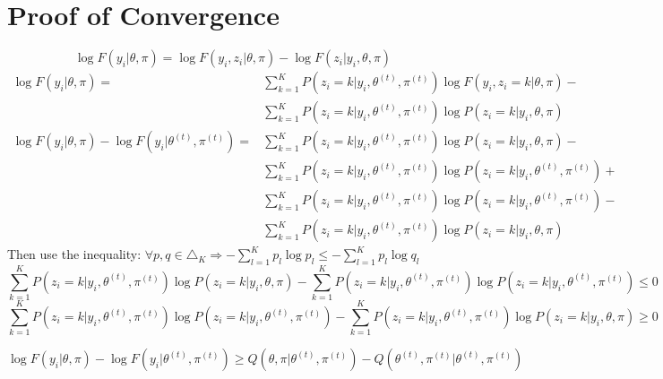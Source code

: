 \documentclass[11pt]{article}
\begin{document}
\section{Proof of Convergence}
$$\log F(y_i|\theta,\pi)=\log F(y_i,z_i|\theta,\pi)-\log F(z_i|y_i,\theta,\pi)$$
\begin{align*}
	\log F(y_i|\theta,\pi)=&\sum_{k=1}^KP(z_i=k|y_i,\theta^{(t)},\pi^{(t)})
	\log F(y_i,z_i=k|\theta,\pi)-\\
	&\sum_{k=1}^KP(z_i=k|y_i,\theta^{(t)},\pi^{(t)})
	\log P(z_i=k|y_i,\theta,\pi)\\
	\log F(y_i|\theta,\pi)-\log F(y_i|\theta^{(t)},\pi^{(t)})=&\sum_{k=1}^KP(z_i=k|y_i,\theta^{(t)},\pi^{(t)})
	\log P(z_i=k|y_i,\theta,\pi)-\\
	&\sum_{k=1}^KP(z_i=k|y_i,\theta^{(t)},\pi^{(t)})
	\log P(z_i=k|y_i,\theta^{(t)},\pi^{(t)})+\\
	&\sum_{k=1}^KP(z_i=k|y_i,\theta^{(t)},\pi^{(t)})
	\log P(z_i=k|y_i,\theta^{(t)},\pi^{(t)})-\\
	&\sum_{k=1}^KP(z_i=k|y_i,\theta^{(t)},\pi^{(t)})
	\log P(z_i=k|y_i,\theta,\pi)
\end{align*}
Then use the inequality: $\forall p,q\in\triangle_K\Rightarrow -\sum_{l=1}^K p_l\log p_l\leq-\sum_{l=1}^K p_l\log q_l$
$$\sum_{k=1}^KP(z_i=k|y_i,\theta^{(t)},\pi^{(t)})
	\log P(z_i=k|y_i,\theta,\pi)-
	\sum_{k=1}^KP(z_i=k|y_i,\theta^{(t)},\pi^{(t)})
	\log P(z_i=k|y_i,\theta^{(t)},\pi^{(t)})\leq 0$$
$$\sum_{k=1}^KP(z_i=k|y_i,\theta^{(t)},\pi^{(t)})
	\log P(z_i=k|y_i,\theta^{(t)},\pi^{(t)})-\sum_{k=1}^KP(z_i=k|y_i,\theta^{(t)},\pi^{(t)})
	\log P(z_i=k|y_i,\theta,\pi)\geq0$$

$$\log F(y_i|\theta,\pi)-\log F(y_i|\theta^{(t)},\pi^{(t)})\geq Q(\theta,\pi|\theta^{(t)},\pi^{(t)})-Q(\theta^{(t)},\pi^{(t)}|\theta^{(t)},\pi^{(t)})$$
\end{document}
